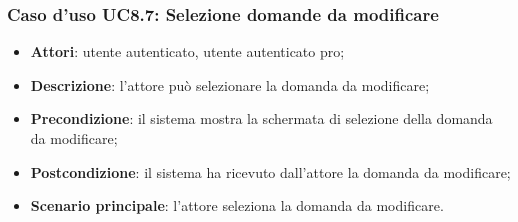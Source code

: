 	\subsubsection{Caso d'uso UC8.7: Selezione domande da modificare}
	\begin{itemize}
		\item \textbf{Attori}: utente autenticato, utente autenticato pro;
		\item \textbf{Descrizione}: l'attore può selezionare la domanda da modificare;
		\item \textbf{Precondizione}: il sistema mostra la schermata di selezione della domanda da modificare;
		\item \textbf{Postcondizione}: il sistema ha ricevuto dall'attore la domanda da modificare; 
		\item \textbf{Scenario principale}: l'attore seleziona la domanda da modificare.
		
	\end{itemize}
